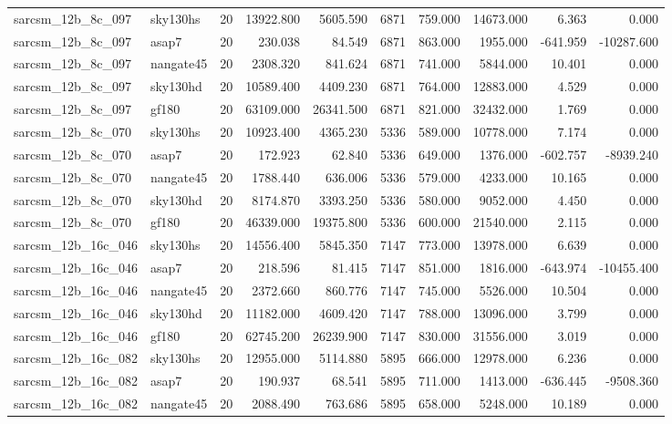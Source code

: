 \documentclass{article}
\begin{document}
\begin{longtable}{llrrrrrrrr}
sarcsm\_12b\_8c\_097 & sky130hs & 20 & 13922.800 & 5605.590 & 6871 & 759.000 & 14673.000 & 6.363 & 0.000 \\
sarcsm\_12b\_8c\_097 & asap7 & 20 & 230.038 & 84.549 & 6871 & 863.000 & 1955.000 & -641.959 & -10287.600 \\
sarcsm\_12b\_8c\_097 & nangate45 & 20 & 2308.320 & 841.624 & 6871 & 741.000 & 5844.000 & 10.401 & 0.000 \\
sarcsm\_12b\_8c\_097 & sky130hd & 20 & 10589.400 & 4409.230 & 6871 & 764.000 & 12883.000 & 4.529 & 0.000 \\
sarcsm\_12b\_8c\_097 & gf180 & 20 & 63109.000 & 26341.500 & 6871 & 821.000 & 32432.000 & 1.769 & 0.000 \\
sarcsm\_12b\_8c\_070 & sky130hs & 20 & 10923.400 & 4365.230 & 5336 & 589.000 & 10778.000 & 7.174 & 0.000 \\
sarcsm\_12b\_8c\_070 & asap7 & 20 & 172.923 & 62.840 & 5336 & 649.000 & 1376.000 & -602.757 & -8939.240 \\
sarcsm\_12b\_8c\_070 & nangate45 & 20 & 1788.440 & 636.006 & 5336 & 579.000 & 4233.000 & 10.165 & 0.000 \\
sarcsm\_12b\_8c\_070 & sky130hd & 20 & 8174.870 & 3393.250 & 5336 & 580.000 & 9052.000 & 4.450 & 0.000 \\
sarcsm\_12b\_8c\_070 & gf180 & 20 & 46339.000 & 19375.800 & 5336 & 600.000 & 21540.000 & 2.115 & 0.000 \\
sarcsm\_12b\_16c\_046 & sky130hs & 20 & 14556.400 & 5845.350 & 7147 & 773.000 & 13978.000 & 6.639 & 0.000 \\
sarcsm\_12b\_16c\_046 & asap7 & 20 & 218.596 & 81.415 & 7147 & 851.000 & 1816.000 & -643.974 & -10455.400 \\
sarcsm\_12b\_16c\_046 & nangate45 & 20 & 2372.660 & 860.776 & 7147 & 745.000 & 5526.000 & 10.504 & 0.000 \\
sarcsm\_12b\_16c\_046 & sky130hd & 20 & 11182.000 & 4609.420 & 7147 & 788.000 & 13096.000 & 3.799 & 0.000 \\
sarcsm\_12b\_16c\_046 & gf180 & 20 & 62745.200 & 26239.900 & 7147 & 830.000 & 31556.000 & 3.019 & 0.000 \\
sarcsm\_12b\_16c\_082 & sky130hs & 20 & 12955.000 & 5114.880 & 5895 & 666.000 & 12978.000 & 6.236 & 0.000 \\
sarcsm\_12b\_16c\_082 & asap7 & 20 & 190.937 & 68.541 & 5895 & 711.000 & 1413.000 & -636.445 & -9508.360 \\
sarcsm\_12b\_16c\_082 & nangate45 & 20 & 2088.490 & 763.686 & 5895 & 658.000 & 5248.000 & 10.189 & 0.000 \\

\end{longtable}
\end{document}
